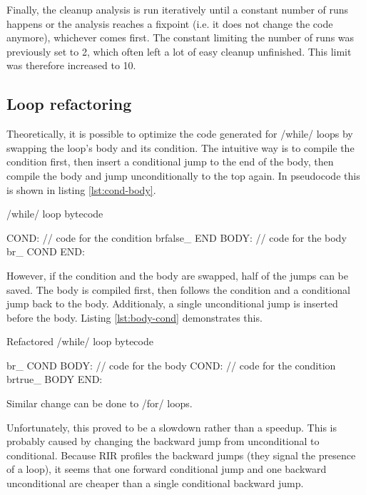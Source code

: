 Finally, the cleanup analysis is run iteratively until a constant number of runs happens or the analysis reaches a fixpoint (i.e. it does not change the code anymore), whichever comes first. The constant limiting the number of runs was previously set to 2, which often left a lot of easy cleanup unfinished. This limit was therefore increased to 10.


\subsection{Loop refactoring}

Theoretically, it is possible to optimize the code generated for \rinline/while/ loops by swapping the loop's body and its condition. The intuitive way is to compile the condition first, then insert a conditional jump to the end of the body, then compile the body and jump unconditionally to the top again. In pseudocode this is shown in listing \ref{lst:cond-body}.

\begin{listing}[htbp]
  \caption{\label{lst:cond-body}\rinline/while/ loop bytecode}
  \begin{ccode}
COND:
    // code for the condition
    brfalse_ END
BODY:
    // code for the body
    br_ COND
END:
  \end{ccode}
\end{listing}

However, if the condition and the body are swapped, half of the jumps can be saved. The body is compiled first, then follows the condition and a conditional jump back to the body. Additionaly, a single unconditional jump is inserted before the body. Listing \ref{lst:body-cond} demonstrates this.

\begin{listing}[htbp]
  \caption{\label{lst:body-cond}Refactored \rinline/while/ loop bytecode}
  \begin{ccode}
    br_ COND
BODY:
    // code for the body
COND:
    // code for the condition
    brtrue_ BODY
END:
  \end{ccode}
\end{listing}

Similar change can be done to \rinline/for/ loops.

Unfortunately, this proved to be a slowdown rather than a speedup. This is probably caused by changing the backward jump from unconditional to conditional. Because RIR profiles the backward jumps (they signal the presence of a loop), it seems that one forward conditional jump and one backward unconditional are cheaper than a single conditional backward jump.


